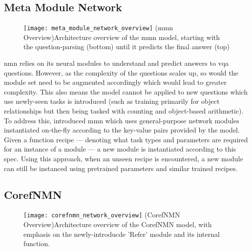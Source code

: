 
\subsection{Meta Module Network}
\label{subsec:meta_module_network}

\begin{figure}[htbp]
    \centering
    \texttt{[image: meta\_module\_network\_overview]}
    \captionsource(\acrshort{mmn} Overview){Architecture overview of the \acrshort{mmn} model, starting with the question-parsing (bottom) until it predicts the final answer (top) \label{fig:mmn_overview}}{\citeauthor{chen_meta_2020}\cite{chen_meta_2020}}
\end{figure}

\gls{nmn} relies on its neural modules to understand and predict answers to \gls{vqa} questions.
However, as the complexity of the questions scales up, so would the module set need to be augmented accordingly which would lead to greater complexity.
This also means the model cannot be applied to new questions which use newly-seen tasks is introduced (such as training primarily for object relationships but then being tasked with counting and object-based arithmetic).
To address this, \citeauthor{chen_meta_2020} introduced \gls{mmn} \cite{chen_meta_2020} which uses general-purpose network modules instantiated on-the-fly according to the key-value pairs provided by the model.
Given a function recipe --- denoting what task types and parameters are required for an instance of a module --- a new module is instantiated according to this spec.
Using this approach, when an unseen recipe is encountered, a new module can still be instanced using pretrained parameters and similar trained recipes.


\subsection{CorefNMN}
\label{subsec:corefnmn}

\begin{figure}[htbp]
    \centering
    \texttt{[image: corefnmn\_network\_overview]}
    \captionsource(CorefNMN Overview){Architecture overview of the CorefNMN model, with emphasis on the newly-introducde 'Refer' module and its internal function. \label{fig:corefnmn_overview}}{\citeauthor{kottur_visual_2018}\cite{kottur_visual_2018}}
\end{figure}

